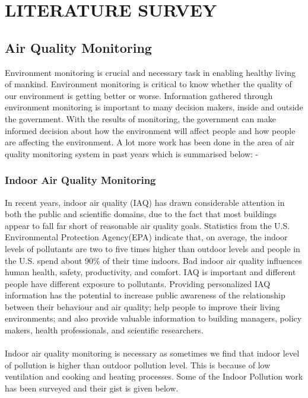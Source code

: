 \chapter{LITERATURE SURVEY} %

\label{Chapter2} %


\section{Air Quality Monitoring }

Environment monitoring is crucial and necessary task in enabling healthy living of mankind. Environment monitoring is critical to know whether the quality of our environment is getting better or worse. Information gathered through environment monitoring is important to many decision makers, inside and outside the government. With the results of monitoring, the government can make informed decision about how the environment will affect people and how people are affecting the environment. A lot more work has been done in the area of air quality monitoring system in past years which is summarised below: -

\subsection{Indoor Air Quality Monitoring}
In recent years, indoor air quality (IAQ) has drawn considerable attention in both the public and scientific domains, due to the fact that most buildings appear to fall far short of reasonable air quality goals. Statistics from the U.S. Environmental Protection Agency(EPA) indicate that, on average, the indoor levels of pollutants are two to five times higher than outdoor levels and people in the U.S. spend about 90\% of their time indoors. Bad indoor air quality influences human health, safety, productivity, and comfort. IAQ is important and different people have different exposure to pollutants. Providing personalized IAQ information has the potential to increase public awareness of the relationship between their behaviour and air quality; help people to improve their living environments; and also provide valuable information to building managers, policy makers, health professionals, and scientific researchers.
\\
\\
Indoor air quality monitoring is necessary as sometimes we find that indoor level of pollution is higher than outdoor pollution level. This is because of low ventilation and cooking and heating processes. Some of the Indoor Pollution work has been surveyed and their gist is given below.

